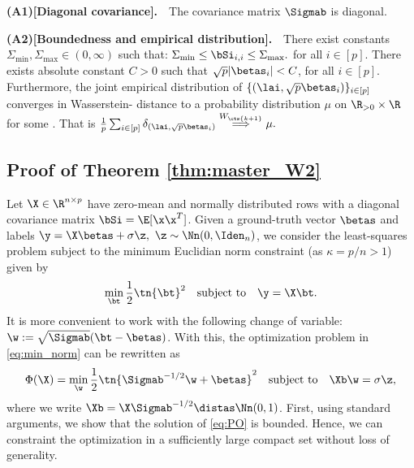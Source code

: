%
\textbf{(A1)[Diagonal covariance].}~~The covariance matrix $\Sigmab$ is diagonal.

%
\textbf{(A2)[Boundedness and empirical distribution].}~~There exist constants $\Sigma_{\min},\Sigma_{\max}\in(0,\infty)$ such that:
$
\Sigma_{\min}\leq\bSi_{i,i}\leq \Sigma_{\max}.
$
for all $i\in[p].$ There exists absolute constant  $C>0$ such that $\sqrt{p}|\betas_i|<C$, for all $i\in[p]$. Furthermore, the joint empirical distribution of $\{(\lai,\sqrt{p}\betas_i)\}_{i\in[p]}$ converges in {Wasserstein-} distance to a probability distribution $\mu$ on $\R_{>0}\times\R$ {for some }. That is
$
\frac{1}{p}\sum_{i\in[p]}\delta_{(\lai,\sqrt{p}\betas_i)} \stackrel{W_{\cts{k+1}}}{\Longrightarrow} \mu.
$





\subsection{Proof of Theorem \ref{thm:master_W2}}
\vspace{5pt}
Let $\X\in\R^{n\times p}$ have zero-mean and normally distributed rows with a diagonal covariance matrix $\bSi=\E[\x\x^T]$. Given a ground-truth vector $\betas$ and labels $\y=\X\betas+\sigma \z,~\z\sim\Nn(0,\Iden_n)$, we consider the least-squares problem subject to the minimum Euclidian norm constraint (as $\kappa=p/n>1$) given by
\begin{align}\label{eq:PO_beta}
\min_{\bt}\frac{1}{2}\tn{\bt}^2\quad\text{subject to}\quad \y=\X\bt.
\end{align}
It is more convenient to work with the following change of variable: $\w:=\sqrt{\Sigmab}(\bt-\betas)$. With this, the optimization problem  in \eqref{eq:min_norm} can be rewritten as
\begin{align}\label{eq:PO}
\Phi(\X)=\min_{\w} \frac{1}{2}\tn{\Sigmab^{-1/2}\w+\betas}^2\quad\text{subject to}\quad \Xb\w=\sigma \z,
\end{align}
where we write $\Xb=\X\Sigmab^{-1/2}\distas\Nn(0,1)$. First, using standard arguments, we show that the solution of \eqref{eq:PO} is bounded. Hence, we can constraint the optimization in a sufficiently large compact set without loss of generality.

